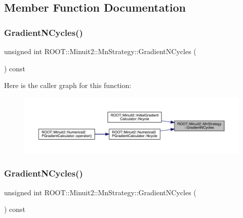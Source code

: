 \subsection{Member Function Documentation}
\mbox{\label{classROOT_1_1Minuit2_1_1MnStrategy_ab2f1980e3eb9f9b0818cf6f8c24b6311}} 
\subsubsection{\texorpdfstring{GradientNCycles()}{GradientNCycles()}\hspace{0.1cm}{\footnotesize\ttfamily [1/3]}}
{\footnotesize\ttfamily unsigned int R\+O\+O\+T\+::\+Minuit2\+::\+Mn\+Strategy\+::\+Gradient\+N\+Cycles (\begin{DoxyParamCaption}{ }\end{DoxyParamCaption}) const\hspace{0.3cm}{\ttfamily [inline]}}

Here is the caller graph for this function\+:
\nopagebreak
\begin{figure}[H]
\begin{center}
\leavevmode
\includegraphics[width=350pt]{da/de4/classROOT_1_1Minuit2_1_1MnStrategy_ab2f1980e3eb9f9b0818cf6f8c24b6311_icgraph}
\end{center}
\end{figure}
\mbox{\label{classROOT_1_1Minuit2_1_1MnStrategy_ab2f1980e3eb9f9b0818cf6f8c24b6311}} 
\subsubsection{\texorpdfstring{GradientNCycles()}{GradientNCycles()}\hspace{0.1cm}{\footnotesize\ttfamily [2/3]}}
{\footnotesize\ttfamily unsigned int R\+O\+O\+T\+::\+Minuit2\+::\+Mn\+Strategy\+::\+Gradient\+N\+Cycles (\begin{DoxyParamCaption}{ }\end{DoxyParamCaption}) const\hspace{0.3cm}{\ttfamily [inline]}}

